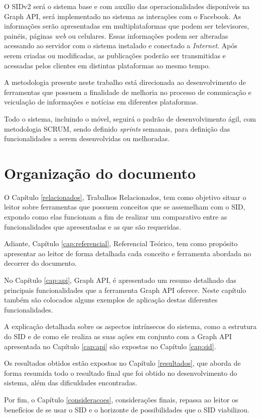 O SIDv2 será o sistema base e com auxílio das operacionalidades disponíveis na Graph API, será implementado no sistema as interações com o Facebook. As informações serão apresentadas em multiplataformas que podem ser televisores, painéis, páginas \textit{web} ou celulares. Essas informações podem ser alteradas acessando ao servidor com o sistema instalado e conectado a \textit{Internet}. Após serem criadas ou modificadas, as publicações poderão ser transmitidas e acessadas pelos clientes em distintas plataformas ao mesmo tempo.

A metodologia presente neste trabalho está direcionada ao desenvolvimento de ferramentas que possuem a finalidade de melhoria no processo de comunicação e veiculação de informações e notícias em diferentes plataformas. 

Todo o sistema, incluindo o móvel, seguirá o padrão de desenvolvimento ágil, com metodologia SCRUM, sendo definido \textit{sprints} semanais, para definição das funcionalidades a serem desenvolvidas ou melhoradas. 

\section{Organização do documento}
O Capítulo \ref{relacionados}, Trabalhos Relacionados, tem como objetivo situar o leitor sobre ferramentas que possuem conceitos que se assemelham com o SID, expondo como elas funcionam a fim de realizar um comparativo entre as funcionalidades que apresentadas e as que são requeridas.

Adiante, Capítulo \ref{cap:referencial}, Referencial Teórico, tem como propósito apresentar ao leitor de forma detalhada cada conceito e ferramenta abordada no decorrer do documento.

No Capítulo \ref{cap:api}, Graph API, é apresentado um resumo detalhado das principais funcionalidades que a ferramenta Graph API oferece. Neste capítulo também são colocados alguns exemplos de aplicação destas diferentes funcionalidades.

A explicação detalhada sobre os aspectos intrínsecos do sistema, como a estrutura do SID e de como ele realiza as suas ações em conjunto com a Graph API apresentada no Capítulo \ref{cap:api} são expostas no Capítulo \ref{cap:sid}.

Os resultados obtidos estão expostos no Capítulo \ref{resultados}, que aborda de forma resumida todo o resultado final que foi obtido no desenvolvimento do sistema, além das dificuldades encontradas.

Por fim, o Capítulo \ref{consideracoes}, considerações finais, repassa ao leitor os benefícios de se usar o SID e o horizonte de possibilidades que o SID viabilizou.